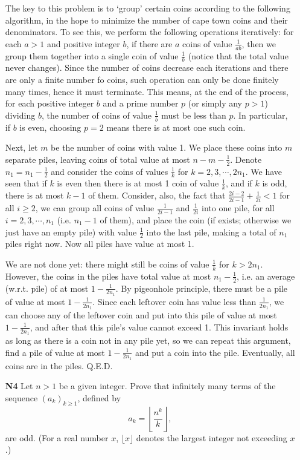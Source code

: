 \documentclass[11pt,a4paper]{article}
\begin{document}
\begin{enumerate}
	The key to this problem is to `group' certain coins according to the following algorithm, in the hope to minimize the number of cape town coins and their denominators. To see this, we perform the following operations iteratively: for each $a>1$ and positive integer $b$, if there are $a$ coins of value $\frac {1}{ab}$, then we group them together into a single coin of value $\frac {1}{b}$ (notice that the total value never changes). Since the number of coins decrease each iterations and there are only a finite number fo coins, such operation can only be done finitely many times, hence it must terminate. This means, at the end of the process, for each positive integer $b$ and a prime number $p$ (or simply any $p>1$) dividing $b$, the number of coins of value $\frac{1}{b}$ must be less than $p$. In particular, if $b$ is even, choosing $p=2$ means there is at most one such coin. 
	
	Next, let $m$ be the number of coins with value 1. We place these coins into $m$ separate piles, leaving coins of total value at most $n-m-\frac 12$. Denote $n_1=n_1-\frac 12$ and consider the coins of values $\frac{1}{k}$ for $k=2, 3, \cdots , 2n_1$. 
	We have seen that if $k$ is even then there is at most 1 coin of value $\frac 1k$, and if $k$ is odd, there is at most $k-1$ of them. Consider, also, the fact that $\frac{2i-2}{2i-1}+\frac{1}{2i}<1$ for all $i\ge 2$, we can group all coins of value $\frac{1}{2i-1}$ and $\frac{1}{2i}$ into one pile, for all $i=2, 3, \cdots , n_1$ (i.e. $n_1-1$ of them), and place the coin (if exists; otherwise we just have an empty pile) with value $\frac 12$ into the last pile, making a total of $n_1$ piles right now. Now all piles have value at most 1. 
	
	We are not done yet: there might still be coins of value $\frac{1}{k}$ for $k>2n_1$. However, the coins in the piles have total value at most $n_1-\frac 12$, i.e. an average (w.r.t. pile) of at most $1-\frac{1}{2n_1}$. 
	By pigeonhole principle, there must be a pile of value at most $1-\frac{1}{2n_1}$. Since each leftover coin has value less than $\frac{1}{2n_1}$, we can choose any of the leftover coin and put into this pile of value at most $1-\frac{1}{2n_1}$, and after that this pile's value cannot exceed 1. This invariant holds as long as there is a coin not in any pile yet, so we can repeat this argument, find a pile of value at most $1-\frac{1}{2n_1}$ and put a coin into the pile. Eventually, all coins are in the piles. Q.E.D. 
	
	\item[\textbf{N4}] Let $n > 1$ be a given integer. Prove that infinitely many terms of the sequence $(a_k )_{k\ge 1}$, defined by \[a_k=\left\lfloor\frac{n^k}{k}\right\rfloor,\] are odd. (For a real number $x$, $\lfloor x\rfloor$ denotes the largest integer not exceeding $x$.)
	

\end{enumerate}
\end{document}
